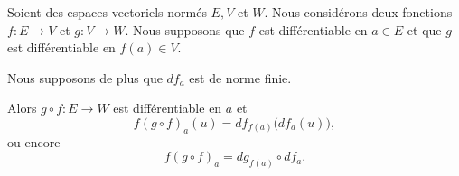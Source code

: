 \begin{theorem}     \label{THOooIHPIooIUyPaf}
    Soient des espaces vectoriels normés \( E,V\) et \( W\). Nous considérons deux fonctions \( f\colon E\to V\) et \( g\colon V\to W\). Nous supposons que \( f\) est différentiable en \( a\in E\) et que \( g\) est différentiable en \( f(a)\in V\). 

    Nous supposons de plus que \( df_a\) est de norme finie.
    
    
    Alors \( g\circ f\colon E\to W\) est différentiable en \( a\) et
    \begin{equation}
        f(g\circ f)_a(u)=df_{f(a)}\big( df_a(u) \big),
    \end{equation}
    ou encore
    \begin{equation}
        f(g\circ f)_a=dg_{f(a)}\circ df_a.
    \end{equation}
\end{theorem}

